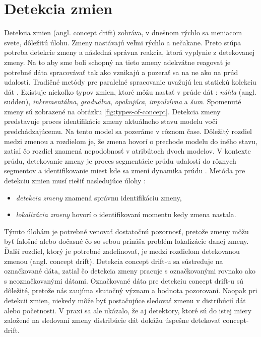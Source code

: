 \section{Detekcia zmien}
Detekcia zmien (angl. concept drift) zohráva, v dnešnom rýchlo sa meniacom svete, dôležitú úlohu. Zmeny nastávajú veľmi rýchlo a nečakane. Preto stúpa potreba detekcie zmeny a následná správna reakcia, ktorá vyplynie z detekovanej zmeny. Na to aby sme boli schopný na tieto zmeny adekvátne reagovať je potrebné dáta spracovávať tak ako vznikajú a pozerať sa na ne ako na prúd udalostí. Tradičné metódy pre paralelné spracovanie uvažujú len statickú kolekciu dát \citep{tran2014change}. Existuje niekoľko typov zmien, ktoré môžu nastať v prúde dát \citep{wadewale2015survey}: \textit{náhla} (angl. sudden), \textit{inkrementálna}, \textit{graduálna}, \textit{opakujúca}, \textit{impulzívna} a \textit{šum}. Spomenuté zmeny sú zobrazené na obrázku \ref{fig:types-of-concept}.
\label{fig:types-of-concept}
Detekcia zmeny predstavuje proces identifikácie zmeny aktuálneho stavu modelu voči predchádzajúcemu. Na tento model sa pozeráme v rôznom čase. Dôležitý rozdiel medzi zmenou a rozdielom je, že zmena hovorí o prechode modelu do iného stavu, zatiaľ čo rozdiel znamená nepodobnosť v atribútoch dvoch modelov. V kontexte prúdu, detekovanie zmeny je proces segmentácie prúdu udalostí do rôznych segmentov a identifikovanie miest kde sa zmení dynamika prúdu \citep{ross2009online}. Metóda pre detekciu zmien musí riešiť nasledujúce úlohy \citep{tran2014change}: 
\begin{itemize}
	\item \textit{detekcia zmeny} znamená správnu identifikáciu zmeny,
	\item \textit{lokalizácia zmeny} hovorí o identifikovaní momentu kedy zmena nastala.
\end{itemize}
 Týmto úlohám je potrebné venovať dostatočnú pozornosť, pretože zmeny môžu byť falošné alebo dočasné čo so sebou prináša problém lokalizácie danej zmeny. Ďalší rozdiel, ktorý je potrebné zadefinovať, je medzi rozdielom detekovanou zmenou (angl. concept drift). Detekcia concept drift-u sa sústreďuje na označkované dáta, zatiaľ čo detekcia zmeny pracuje s označkovanými rovnako ako s neoznačkovanými dátami. Označkované dáta pre detekciu concept drift-u sú dôležité, pretože nás zaujíma skutočný význam a hodnota pozorovaní. Naopak pri detekcii zmien, niekedy môže byť postačujúce sledovať zmenu v distribúcií dát alebo početnosti. V praxi sa ale ukázalo, že aj detektory, ktoré sú do istej miery založené na sledovaní zmeny distribúcie dát dokážu úspešne detekovať concept-drift.
